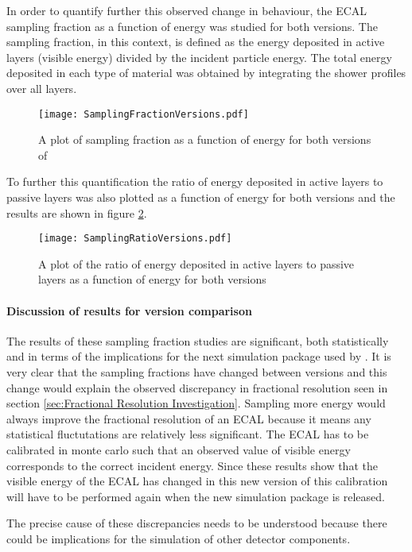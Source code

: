 In order to quantify further this observed change in behaviour, the ECAL sampling fraction as a function of energy was studied for both \geant versions.  The sampling fraction, in this context, is defined as the energy deposited in active layers (visible energy) divided by the incident particle energy.  The total energy deposited in each type of material was obtained by integrating the shower profiles over all layers. 
\begin{figure}[h]
  \centering
  \texttt{[image: SamplingFractionVersions.pdf]}
  \caption{A plot of sampling fraction as a function of energy for both versions of \geant}
  \label{fig:sfcomp}
\end{figure}
To further this quantification the ratio of energy deposited in active layers to passive layers was also plotted as a function of energy for both \geant versions and the results are shown in figure \ref{fig:ratiocomp}.
\begin{figure}[h]
  \centering
  \texttt{[image: SamplingRatioVersions.pdf]}
  \caption{A plot of the ratio of energy deposited in active layers to passive layers as a function of energy for both \geant versions}
  \label{fig:ratiocomp}
\end{figure}

\paragraph{Discussion of results for \geant version comparison}
\label{sec:Discussionofresultsone}
The results of these sampling fraction studies are significant, both statistically and in terms of the implications for the next simulation package used by \lhcb.  It is very clear that the sampling fractions have changed between \geant versions and this change would explain the observed discrepancy in fractional resolution seen in section \ref{sec:Fractional Resolution Investigation}.  Sampling more energy would always improve the fractional resolution of an ECAL because it means any statistical fluctutations are relatively less significant. The ECAL has to be calibrated in monte carlo such that an observed value of visible energy corresponds to the correct incident energy.  Since these results show that the visible energy of the ECAL has changed in this new version of \geant this calibration will have to be performed again when the new simulation package is released.

The precise cause of these discrepancies needs to be understood because there could be implications for the simulation of other detector components.

